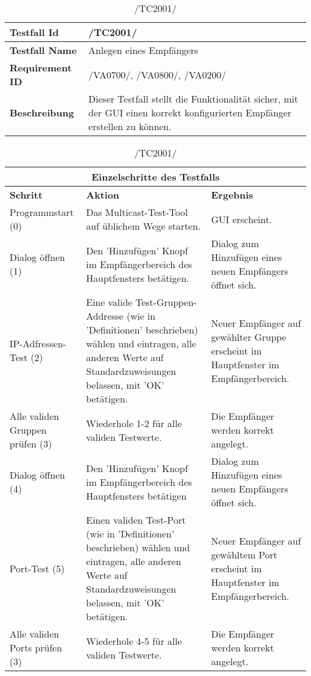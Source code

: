 \begin{table}[h]
\caption{/TC2001/}
\label{tab:TC2001}
\begin{center}
\begin{tabular}{|p{3.5cm}|p{12cm}|}
\hline
\textbf{Testfall Id} & /TC2001/\\
\hline
\textbf{Testfall Name} & Anlegen eines Empfängers\\
\hline
\textbf{Requirement ID} & /VA0700/, /VA0800/, /VA0200/\\
\hline
\textbf{Beschreibung} & Dieser Testfall stellt die Funktionalität sicher, mit
der GUI einen korrekt konfigurierten Empfänger erstellen zu können.\\
\hline
\end{tabular}
\begin{tabular}{|p{2.5cm}|p{5cm}|p{7.55cm}|}
\multicolumn{3}{|c|}{\textbf{Einzelschritte des Testfalls}} \\
\hline
\textbf{Schritt} & \textbf{Aktion} & \textbf{Ergebnis}\\
\hline
Programmstart (0)& Das Multicast-Test-Tool auf üblichem Wege starten. & GUI
erscheint.\\
\hline
Dialog öffnen (1) & Den 'Hinzufügen' Knopf im Empfängerbereich des Hauptfensters
betätigen. & Dialog zum Hinzufügen eines neuen Empfängers öffnet sich.\\
\hline
IP-Adfressen-Test (2) & Eine valide Test-Gruppen-Addresse (wie in 'Definitionen'
beschrieben) wählen und eintragen, alle anderen Werte auf Standardzuweisungen
belassen, mit 'OK' betätigen. & Neuer Empfänger auf gewählter Gruppe erscheint im
Hauptfenster im Empfängerbereich.\\
\hline
Alle validen Gruppen prüfen (3) & Wiederhole 1-2 für alle validen Testwerte. & Die Empfänger werden korrekt angelegt.\\
\hline
Dialog öffnen (4) & Den 'Hinzufügen' Knopf im Empfängerbereich des Hauptfensters
betätigen & Dialog zum Hinzufügen eines neuen Empfängers öffnet sich.\\
\hline
Port-Test (5) & Einen validen Test-Port (wie in 'Definitionen'
beschrieben) wählen und eintragen, alle anderen Werte auf Standardzuweisungen
belassen, mit 'OK' betätigen. & Neuer Empfänger auf gewähltem Port erscheint im
Hauptfenster im Empfängerbereich.\\
\hline
Alle validen Ports prüfen (3) & Wiederhole 4-5 für alle validen Testwerte. & Die Empfänger werden korrekt angelegt.\\
\hline
\end{tabular}
\end{center}
\label{default}
\end{table}

